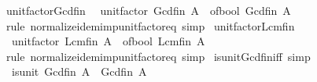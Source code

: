 \begin{isabellebody}
\isanewline
{}\isamarkupfalse%
%
\endisatagproof
{\isafoldproof}%
%
\isadelimproof
\isanewline
%
\endisadelimproof
\isanewline
{}\isamarkupfalse%
\ unit{\isacharunderscore}{\kern0pt}factor{\isacharunderscore}{\kern0pt}Gcd{\isacharunderscore}{\kern0pt}fin{\isacharcolon}{\kern0pt}\isanewline
\ \ {\isachardoublequoteopen}unit{\isacharunderscore}{\kern0pt}factor\ {\isacharparenleft}{\kern0pt}Gcd\isactrlsub f\isactrlsub i\isactrlsub n\ A{\isacharparenright}{\kern0pt}\ {\isacharequal}{\kern0pt}\ of{\isacharunderscore}{\kern0pt}bool\ {\isacharparenleft}{\kern0pt}Gcd\isactrlsub f\isactrlsub i\isactrlsub n\ A\ {\isasymnoteq}\ {}{\isacharparenright}{\kern0pt}{\isachardoublequoteclose}\isanewline
%
\isadelimproof
\ \ %
\endisadelimproof
%
\isatagproof
{}\isamarkupfalse%
\ {\isacharparenleft}{\kern0pt}rule\ normalize{\isacharunderscore}{\kern0pt}idem{\isacharunderscore}{\kern0pt}imp{\isacharunderscore}{\kern0pt}unit{\isacharunderscore}{\kern0pt}factor{\isacharunderscore}{\kern0pt}eq{\isacharparenright}{\kern0pt}\ simp%
\endisatagproof
{\isafoldproof}%
%
\isadelimproof
\isanewline
%
\endisadelimproof
\isanewline
{}\isamarkupfalse%
\ unit{\isacharunderscore}{\kern0pt}factor{\isacharunderscore}{\kern0pt}Lcm{\isacharunderscore}{\kern0pt}fin{\isacharcolon}{\kern0pt}\isanewline
\ \ {\isachardoublequoteopen}unit{\isacharunderscore}{\kern0pt}factor\ {\isacharparenleft}{\kern0pt}Lcm\isactrlsub f\isactrlsub i\isactrlsub n\ A{\isacharparenright}{\kern0pt}\ {\isacharequal}{\kern0pt}\ of{\isacharunderscore}{\kern0pt}bool\ {\isacharparenleft}{\kern0pt}Lcm\isactrlsub f\isactrlsub i\isactrlsub n\ A\ {\isasymnoteq}\ {}{\isacharparenright}{\kern0pt}{\isachardoublequoteclose}\isanewline
%
\isadelimproof
\ \ %
\endisadelimproof
%
\isatagproof
{}\isamarkupfalse%
\ {\isacharparenleft}{\kern0pt}rule\ normalize{\isacharunderscore}{\kern0pt}idem{\isacharunderscore}{\kern0pt}imp{\isacharunderscore}{\kern0pt}unit{\isacharunderscore}{\kern0pt}factor{\isacharunderscore}{\kern0pt}eq{\isacharparenright}{\kern0pt}\ simp%
\endisatagproof
{\isafoldproof}%
%
\isadelimproof
\isanewline
%
\endisadelimproof
\isanewline
{}\isamarkupfalse%
\ is{\isacharunderscore}{\kern0pt}unit{\isacharunderscore}{\kern0pt}Gcd{\isacharunderscore}{\kern0pt}fin{\isacharunderscore}{\kern0pt}iff\ {\isacharbrackleft}{\kern0pt}simp{\isacharbrackright}{\kern0pt}{\isacharcolon}{\kern0pt}\isanewline
\ \ {\isachardoublequoteopen}is{\isacharunderscore}{\kern0pt}unit\ {\isacharparenleft}{\kern0pt}Gcd\isactrlsub f\isactrlsub i\isactrlsub n\ A{\isacharparenright}{\kern0pt}\ {\isasymlongleftrightarrow}\ Gcd\isactrlsub f\isactrlsub i\isactrlsub n\ A\ {\isacharequal}{\kern0pt}\ {}{\isachardoublequoteclose}\isanewline

\end{isabellebody}
